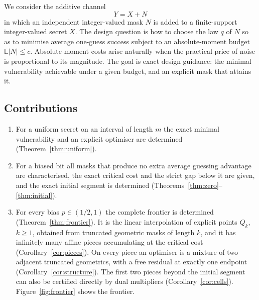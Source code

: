\documentclass[conference]{IEEEtran}
\newcommand{\E}{\mathbb{E}}
\begin{document}
We consider the additive channel
\[
Y=X+N
\]
in which an independent integer-valued mask \(N\) is added to a finite-support integer-valued secret \(X\). The design question is how to choose the law \(q\) of \(N\) so as to minimise average one-guess success subject to an absolute-moment budget \(\E|N|\le c\). Absolute-moment costs arise naturally when the practical price of noise is proportional to its magnitude. The goal is exact design guidance: the minimal vulnerability achievable under a given budget, and an explicit mask that attains it.

\subsection{Contributions}
\begin{enumerate}
\item For a uniform secret on an interval of length \(m\) the exact minimal vulnerability and an explicit optimiser are determined (Theorem~\ref{thm:uniform}).
\item For a biased bit all masks that produce no extra average guessing advantage are characterised, the exact critical cost and the strict gap below it are given, and the exact initial segment is determined (Theorems~\ref{thm:zero}--\ref{thm:initial}).
\item For every bias \(p\in(1/2,1)\) the complete frontier is determined (Theorem~\ref{thm:frontier}). It is the linear interpolation of explicit points \(Q_k\), \(k\ge1\), obtained from truncated geometric masks of length \(k\), and it has infinitely many affine pieces accumulating at the critical cost (Corollary~\ref{cor:pieces}). On every piece an optimiser is a mixture of two adjacent truncated geometrics, with a free residual at exactly one endpoint (Corollary~\ref{cor:structure}). The first two pieces beyond the initial segment can also be certified directly by dual multipliers (Corollary~\ref{cor:cells}). Figure~\ref{fig:frontier} shows the frontier.
\end{enumerate}
\end{document}
